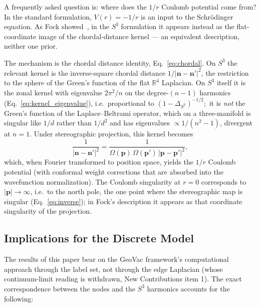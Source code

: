\documentclass[aps,pra,twocolumn,superscriptaddress,longbibliography]{revtex4-2}
\newcommand{\gvc}[2]{#2}
\begin{document}
A frequently asked question is: where does the $1/r$ Coulomb potential come from? In the standard formulation, $V(r) = -1/r$ is an input to the Schr\"odinger equation. As Fock showed~\cite{fock1935}, in the $S^3$ formulation it appears instead as the flat-coordinate image of the chordal-distance kernel --- an equivalent description, neither one prior.

The mechanism is the chordal distance identity, Eq.~\eqref{eq:chordal}. On $S^3$ the relevant kernel is the inverse-square chordal distance $1/|\mathbf{n} - \mathbf{n}'|^2$, the restriction to the sphere of the Green's function of the flat $\mathbb{R}^4$ Laplacian. On $S^3$ itself it is the zonal kernel with eigenvalue $2\pi^2/n$ on the degree-$(n-1)$ harmonics (Eq.~\eqref{eq:kernel_eigenvalue}), i.e.\ proportional to $(1-\Delta_{S^3})^{-1/2}$;\ it is \emph{not} the Green's function of the Laplace--Beltrami operator, which on a three-manifold is singular like $1/d$ rather than $1/d^2$ and has eigenvalues $\propto 1/(n^2-1)$, divergent at $n = 1$. Under stereographic projection, this kernel becomes
\begin{equation}
\frac{1}{|\mathbf{n} - \mathbf{n}'|^2} = \frac{1}{\Omega(\mathbf{p})\,\Omega(\mathbf{p}')\,|\mathbf{p} - \mathbf{p}'|^2},
\end{equation}
which, when Fourier transformed to position space, yields the $1/r$ Coulomb potential (with conformal weight corrections that are absorbed into the wavefunction normalization). The Coulomb singularity at $r = 0$ corresponds to $|\mathbf{p}| \to \infty$, i.e.\ to the north pole, the one point where the stereographic map is singular (Eq.~\eqref{eq:inverse}); in Fock's description it appears as that coordinate singularity of the projection.

\subsection{Implications for the Discrete Model}

The results of this paper bear on the GeoVac framework's computational approach through the label set, \gvc{graph-s3-wall}{not through the edge Laplacian (whose continuum-limit reading is withdrawn, New Contributions item 1)}. The exact correspondence between the nodes and the $S^3$ harmonics accounts for the following:
\end{document}
